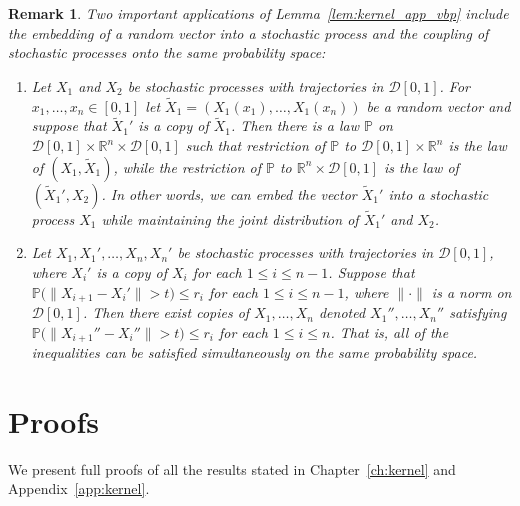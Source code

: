 \documentclass[11pt,lof]{puthesis}
\renewcommand{\P}{\ensuremath{\mathbb{P}}}
\newcommand{\R}{\ensuremath{\mathbb{R}}}
\newcommand{\cD}{\ensuremath{\mathcal{D}}}
\theoremstyle{break}
\newtheorem{remark}{Remark}[section]
\theoremstyle{proof}
\begin{document}
\begin{remark}

  Two important applications of
  Lemma~\ref{lem:kernel_app_vbp} include
  the embedding of a random vector into a stochastic process
  and the coupling of stochastic processes
  onto the same probability space:
  \begin{enumerate}[label=(\roman*)]

    \item
      Let $X_1$ and $X_2$
      be stochastic processes with
      trajectories in $\cD[0,1]$.
      For $x_1, \ldots, x_n \in [0,1]$
      let $\tilde X_1 = (X_1(x_1), \ldots, X_1(x_n))$
      be a random vector
      and suppose that $\tilde X_1'$
      is a copy of $\tilde X_1$.
      Then there is a law $\P$ on
      $\cD[0,1] \times \R^n \times \cD[0,1]$
      such that restriction of $\P$ to
      $\cD[0,1] \times \R^n$
      is the law of $(X_1, \tilde X_1)$,
      while the restriction of $\P$ to
      $\R^n \times \cD[0,1]$
      is the law of $(\tilde X_1',X_2)$.
      In other words,
      we can embed the vector $\tilde X_1'$
      into a stochastic process $X_1$
      while maintaining the joint distribution of
      $\tilde X_1'$ and $X_2$.

    \item
      Let $X_1, X_1', \ldots, X_n, X_n'$
      be stochastic processes with
      trajectories in $\cD[0,1]$,
      where $X_i'$ is a copy of $X_i$
      for each $1 \leq i \leq n-1$.
      Suppose that
      $\P\big(\|X_{i+1} - X_i'\| > t)\leq r_i$
      for each $1 \leq i \leq n-1$,
      where $\|\cdot\|$ is a norm on $\cD[0,1]$.
      Then there exist copies of
      $X_1, \ldots, X_n$
      denoted
      $X_1'', \ldots, X_n''$
      satisfying
      $\P\big(\|X_{i+1}'' - X_i''\| > t)\leq r_i$
      for each $1 \leq i \leq n$.
      That is, all of the inequalities
      can be satisfied simultaneously
      on the same probability space.

  \end{enumerate}

\end{remark}

\section{Proofs}
\label{sec:kernel_app_proofs}

We present full proofs of all the results stated in
Chapter~\ref{ch:kernel} and Appendix~\ref{app:kernel}.
\end{document}
